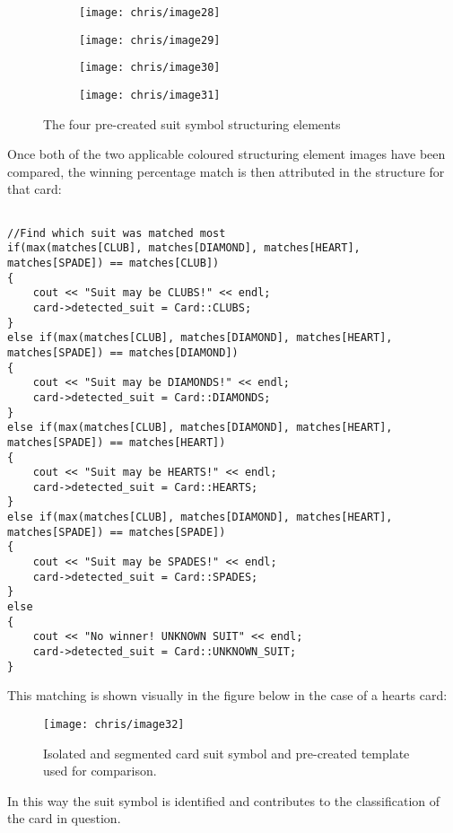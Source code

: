 		\begin{figure}[H]
			\centering
			\begin{subfigure}[b]{0.15\textwidth}
				\centering
				\texttt{[image: chris/image28]}
				\caption{}
			\end{subfigure}
			\begin{subfigure}[b]{0.15\textwidth}
				\centering
				\texttt{[image: chris/image29]}
				\caption{}
			\end{subfigure}
			\begin{subfigure}[b]{0.15\textwidth}
				\centering
				\texttt{[image: chris/image30]}
				\caption{}
			\end{subfigure}
			\begin{subfigure}[b]{0.15\textwidth}
				\centering
				\texttt{[image: chris/image31]}
				\caption{}
			\end{subfigure}
			\caption{The four pre-created suit symbol structuring elements}
			\label{fig:structelems}
		\end{figure}

		Once both of the two applicable coloured structuring element images have been compared, the winning percentage match is then attributed in the structure for that card:

		\begin{lstlisting}

//Find which suit was matched most
if(max(matches[CLUB], matches[DIAMOND], matches[HEART], matches[SPADE]) == matches[CLUB])
{
	cout << "Suit may be CLUBS!" << endl;
	card->detected_suit = Card::CLUBS;  
}
else if(max(matches[CLUB], matches[DIAMOND], matches[HEART], matches[SPADE]) == matches[DIAMOND])
{
	cout << "Suit may be DIAMONDS!" << endl;
	card->detected_suit = Card::DIAMONDS;
}
else if(max(matches[CLUB], matches[DIAMOND], matches[HEART], matches[SPADE]) == matches[HEART])
{
	cout << "Suit may be HEARTS!" << endl;
	card->detected_suit = Card::HEARTS;
}
else if(max(matches[CLUB], matches[DIAMOND], matches[HEART], matches[SPADE]) == matches[SPADE])
{
	cout << "Suit may be SPADES!" << endl;
	card->detected_suit = Card::SPADES;
}
else
{
	cout << "No winner! UNKNOWN SUIT" << endl;
	card->detected_suit = Card::UNKNOWN_SUIT;
}
		\end{lstlisting}

		This matching is shown visually in the figure below in the case of a hearts card:

		\begin{figure}[H]
			\centering
			\texttt{[image: chris/image32]}
			\caption{Isolated and segmented card suit symbol and pre-created template used for comparison.}
		\end{figure}

		In this way the suit symbol is identified and contributes to the classification of the card in question.